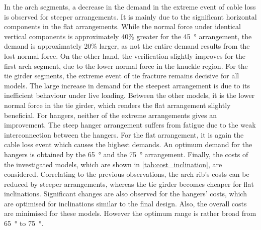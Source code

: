 In the arch segments, a decrease in the demand in the extreme event of cable loss is observed for steeper arrangements. It is mainly due to the significant horizontal components in the flat arrangements. While the normal force under identical vertical components is approximately 40\% greater for the \SI{45}{\degree} arrangement, the demand is approximately 20\% larger, as not the entire demand results from the lost normal force. On the other hand, the verification slightly improves for the first arch segment, due to the lower normal force in the knuckle region. For the tie girder segments, the extreme event of tie fracture remains decisive for all models. The large increase in demand for the steepest arrangement is due to its inefficient behaviour under live loading. Between the other models, it is the lower normal force in the tie girder, which renders the flat arrangement slightly beneficial. For hangers, neither of the extreme arrangements gives an improvement. The steep hanger arrangement suffers from fatigue due to the weak interconnection between the hangers. For the flat arrangement, it is again the cable loss event which causes the highest demands. An optimum demand for the hangers is obtained by the \SI{65}{\degree} and the \SI{75}{\degree} arrangement. Finally, the costs of the investigated models, which are shown in \cref{tab:cost_inclination}, are considered. Correlating to the previous observations, the arch rib's costs can be reduced by steeper arrangements, whereas the tie girder becomes cheaper for flat inclinations. Significant changes are also observed for the hangers' costs, which are optimised for inclinations similar to the final design. Also, the overall costs are minimised for these models. However the optimum range is rather broad from \SI{65}{\degree} to \SI{75}{\degree}.


\begin{table}[H]
    \centering
    \caption{Maximum demand over capacity ratios for different hanger inclinations}
    \label{tab:cost_inclination}
\end{table}

